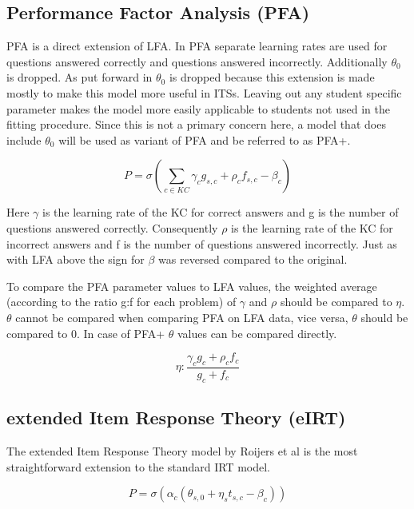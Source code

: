 \documentclass{article}
\begin{document}
\subsection{Performance Factor Analysis (PFA)}
PFA is a direct extension of LFA. In PFA separate learning rates are used for questions answered correctly and questions answered incorrectly. Additionally $\theta_{0}$ is dropped. As put forward in \cite{pfa} $\theta_{0}$ is dropped because this extension is made mostly to make this model more useful in ITSs. Leaving out any student specific parameter makes the model more easily applicable to students not used in the fitting procedure. Since this is not a primary concern here, a model that does include $\theta_{0}$ will be used as variant of PFA and be referred to as PFA+.

\begin{equation}
P = \sigma(\sum_{c \in KC}  \gamma_{c} g_{s,c} + \rho_{c} f_{s,c} - \beta_{c})
\end{equation}

Here $\gamma$ is the learning rate of the KC for correct answers and g is the number of questions answered correctly. Consequently $\rho$ is the learning rate of the KC for incorrect answers and f is the number of questions answered incorrectly. Just as with LFA above the sign for $\beta$ was reversed compared to the original.

To compare the PFA parameter values to LFA values, the weighted average (according to the ratio g:f for each problem) of $\gamma$ and $\rho$ should be compared to $\eta$. $\theta$ cannot be compared when comparing PFA on LFA data, vice versa, $\theta$ should be compared to 0. In case of PFA+ $\theta$ values can be compared directly.


\begin{equation}
\eta: \frac{\gamma_{c} g_{c} + \rho_{c} f_{c}}{g_{c}+f_{c}}
\end{equation}

\subsection{extended Item Response Theory (eIRT)}
\label{sec:eirt}
The extended Item Response Theory model by Roijers et al \cite{eirt} is the most straightforward extension to the standard IRT model.

\begin{equation}
\label{eq:eirt}
P = \sigma(\alpha_{c} (\theta_{s,0} + \eta_{s} t_{s,c} - \beta_{c}))
\end{equation}
\end{document}
